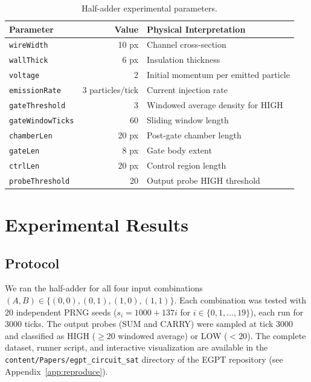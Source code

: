 \documentclass[11pt,a4paper]{article}
\begin{document}
\begin{table}[H]
\centering
\begin{tabular}{lrl}
\toprule
\textbf{Parameter} & \textbf{Value} & \textbf{Physical Interpretation} \\
\midrule
\texttt{wireWidth} & 10 px & Channel cross-section \\
\texttt{wallThick} & 6 px & Insulation thickness \\
\texttt{voltage} & 2 & Initial momentum per emitted particle \\
\texttt{emissionRate} & 3 particles/tick & Current injection rate \\
\texttt{gateThreshold} & 3 & Windowed average density for HIGH \\
\texttt{gateWindowTicks} & 60 & Sliding window length \\
\texttt{chamberLen} & 20 px & Post-gate chamber length \\
\texttt{gateLen} & 8 px & Gate body extent \\
\texttt{ctrlLen} & 20 px & Control region length \\
\texttt{probeThreshold} & 20 & Output probe HIGH threshold \\
\bottomrule
\end{tabular}
\caption{Half-adder experimental parameters.}
\label{tab:params}
\end{table}


\section{Experimental Results}
\label{sec:results}

\subsection{Protocol}

We ran the half-adder for all four input combinations $(A, B) \in \{(0,0), (0,1), (1,0), (1,1)\}$. Each combination was tested with 20 independent PRNG seeds ($s_i = 1000 + 137i$ for $i \in \{0, 1, \ldots, 19\}$), each run for 3000 ticks. The output probes (SUM and CARRY) were sampled at tick 3000 and classified as HIGH ($\geq 20$ windowed average) or LOW ($< 20$). The complete dataset, runner script, and interactive visualization are available in the \texttt{content/Papers/egpt\_circuit\_sat} directory of the EGPT repository (see Appendix~\ref{app:reproduce}).
\end{document}
